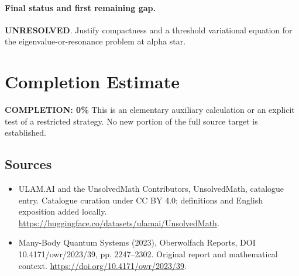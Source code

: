 \documentclass[11pt]{article}
\begin{document}
\paragraph{Final status and first remaining gap.}
\textbf{UNRESOLVED}. Justify compactness and a threshold variational equation for the eigenvalue-or-resonance problem at alpha star.

\section{Completion Estimate}
\noindent\textbf{COMPLETION: 0\%}
This is an elementary auxiliary calculation or an explicit test of a restricted strategy. No new portion of the full source target is established.

\subsection{Sources}
\begin{itemize}
\item[\hypertarget{source:statement:1}{S1}] ULAM.AI and the UnsolvedMath Contributors, UnsolvedMath, catalogue entry. Catalogue curation under CC BY 4.0; definitions and English exposition added locally.
\url{https://huggingface.co/datasets/ulamai/UnsolvedMath}.
\item[\hypertarget{source:statement:2}{S2}] Many-Body Quantum Systems (2023), Oberwolfach Reports, DOI 10.4171/owr/2023/39, pp. 2247--2302. Original report and mathematical context.
\url{https://doi.org/10.4171/owr/2023/39}.
\end{itemize}
\label{end:statement}
\end{document}
